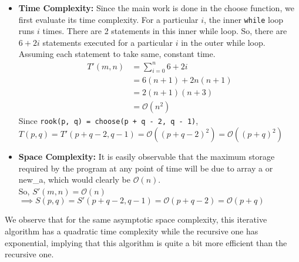 \documentclass[answers]{exam}
\renewcommand{\O}[1]{\mathcal{O}\left(#1\right)}
\begin{document}
\begin{questions}
{\begin{parts}
\begin{solution}
                \begin{itemize}
                    \item {
                        \textbf{Time Complexity: } Since the main work is done in the choose function, we first evaluate
                        its time complexity. For a particular \(i\), the inner \lstinline{while} loop
                        runs \(i\) times. There are 2 statements in this inner while loop.
                        So, there are \(6 + 2i\) statements executed for a particular \(i\) in the outer while loop.
                        Assuming each statement to take same, constant time.
                        \begin{equation*}
                            \begin{aligned}
                                T'(m, n) &= \sum_{i = 0}^{n}{6 + 2i} \\
                                    &= 6(n + 1) + 2n(n + 1)\\
                                    &= 2(n + 1)(n + 3)\\
                                    &= \O{n^2}
                            \end{aligned}
                        \end{equation*}
                        Since \lstinline{rook(p, q) = choose(p + q - 2, q - 1)}, \\
                        \(T(p, q) = T'(p + q - 2, q - 1) = \O{(p + q - 2)^2} = \O{(p + q)^2}\)
                    }
                    \item {
                        \textbf{Space Complexity: } It is easily observable that the maximum storage required
                        by the program at any point of time will be due to array a or new\_a, which would clearly
                        be \(\O{n}\). \\
                        So, \(S'(m, n) = \O{n}\)
                        \(\implies S(p, q) = S'(p + q - 2, q - 1) = \O{p + q - 2} = \O{p + q}\)                     
                    }
                \end{itemize}
                We observe that for the same asymptotic space complexity, this iterative algorithm has a quadratic
                time complexity while the recursive one has exponential, implying that this algorithm is quite a bit
                more efficient than the recursive one.
            \end{solution}
            \end{parts}
        }
    

\end{questions}
\end{document}

